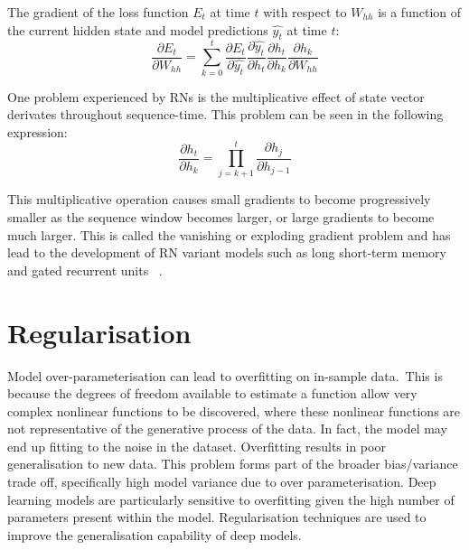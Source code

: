 \noindent The gradient of the loss function $ E_t $ at time $ t $ with respect to $ W_{hh} $ is a function of the current hidden state and model predictions $\hat{y_t}$ at time $ t $:  
\begin{equation}
	\frac{\partial E_t} {\partial W_{hh}} = \sum_{k=0}^{t}\frac{\partial E_t} {\partial \hat{y_t}}\frac{\partial \hat{y_t}} {\partial h_t}\frac{\partial h_t} {\partial h_k}\frac{\partial h_k} {\partial W_{hh}}
\end{equation}

\noindent One problem experienced by RNs is the multiplicative effect of state vector derivates throughout sequence-time. This problem can be seen in the following expression:
\begin{equation}
	\frac{\partial h_t} {\partial h_k} = \prod_{j=k+1}^t\frac{\partial h_j} {\partial h_{j-1}}
\end{equation}

\noindent This multiplicative operation causes small gradients to become progressively smaller as the sequence window becomes larger, or large gradients to become much larger. This is called the vanishing or exploding gradient problem and has lead to the development of RN variant models such as long short-term memory \unskip ~\citep{hochreiter1997long} and gated recurrent units \unskip ~\citep{cho2014learning}.



\section{Regularisation}

Model over-parameterisation can lead to overfitting on in-sample data.\ This is because the degrees of freedom available to estimate a function allow very complex nonlinear functions to be discovered, where these nonlinear functions are not representative of the generative process of the data. In fact, the model may end up fitting to the noise in the dataset. Overfitting results in poor generalisation to new data. This problem forms part of the broader bias/variance trade off, specifically high model variance due to over parameterisation. Deep learning models are particularly sensitive to overfitting given the high number of parameters present within the model. Regularisation techniques are used to improve the generalisation capability of deep models. \par

